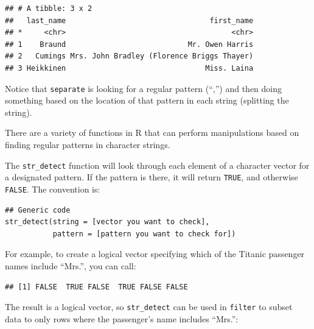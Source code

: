 \documentclass[]{book}
\makeatletter
\newenvironment{Shaded}{\begin{snugshade}}{\end{snugshade}}
\newcommand{\KeywordTok}[1]{\textcolor[rgb]{0.13,0.29,0.53}{\textbf{#1}}}
\newcommand{\DecValTok}[1]{\textcolor[rgb]{0.00,0.00,0.81}{#1}}
\newcommand{\StringTok}[1]{\textcolor[rgb]{0.31,0.60,0.02}{#1}}
\newcommand{\OperatorTok}[1]{\textcolor[rgb]{0.81,0.36,0.00}{\textbf{#1}}}
\newcommand{\NormalTok}[1]{#1}
\newenvironment{kframe}{%
\medskip{}
\setlength{\fboxsep}{.8em}
 \def\at@end@of@kframe{}%
 \ifinner\ifhmode%
  \def\at@end@of@kframe{\end{minipage}}%
  \begin{minipage}{\columnwidth}%
 \fi\fi%
 \def\FrameCommand##1{\hskip\@totalleftmargin \hskip-\fboxsep
 \colorbox{shadecolor}{##1}\hskip-\fboxsep
     \hskip-\linewidth \hskip-\@totalleftmargin \hskip\columnwidth}%
 \MakeFramed {\advance\hsize-\width
   \@totalleftmargin\z@ \linewidth\hsize
   \@setminipage}}%
 {\par\unskip\endMakeFramed%
 \at@end@of@kframe}
\renewenvironment{Shaded}{\begin{kframe}}{\end{kframe}}
\theoremstyle{definition}
\theoremstyle{definition}
\theoremstyle{definition}
\theoremstyle{remark}
\makeatother
\begin{document}
\begin{verbatim}
## # A tibble: 3 x 2
##   last_name                                 first_name
## *     <chr>                                      <chr>
## 1    Braund                            Mr. Owen Harris
## 2   Cumings Mrs. John Bradley (Florence Briggs Thayer)
## 3 Heikkinen                                Miss. Laina
\end{verbatim}

Notice that \texttt{separate} is looking for a regular pattern (``,'')
and then doing something based on the location of that pattern in each
string (splitting the string). \bigskip

There are a variety of functions in R that can perform manipulations
based on finding regular patterns in character strings.

The \texttt{str\_detect} function will look through each element of a
character vector for a designated pattern. If the pattern is there, it
will return \texttt{TRUE}, and otherwise \texttt{FALSE}. The convention
is:

\begin{verbatim}
## Generic code
str_detect(string = [vector you want to check], 
           pattern = [pattern you want to check for])
\end{verbatim}

For example, to create a logical vector specifying which of the Titanic
passenger names include ``Mrs.'', you can call:

\begin{Shaded}
\end{Shaded}

\begin{verbatim}
## [1] FALSE  TRUE FALSE  TRUE FALSE FALSE
\end{verbatim}

The result is a logical vector, so \texttt{str\_detect} can be used in
\texttt{filter} to subset data to only rows where the passenger's name
includes ``Mrs.'':

\begin{Shaded}
\end{Shaded}
\end{document}
